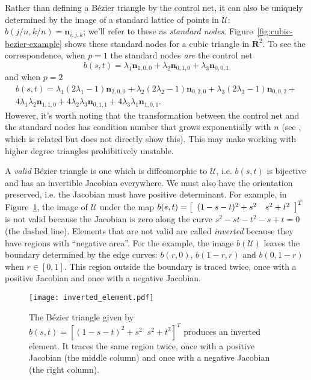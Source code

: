 \documentclass[oneside, reqno]{amsart}
\theoremstyle{definition}
\newcommand{\reals}{\mathbf{R}}
\newcommand{\utri}{\mathcal{U}}
\begin{document}
\noindent Rather than defining a B\'{e}zier triangle by the control net, it can
also be uniquely determined by the image of a standard lattice of
points in \(\utri\): \(b\left(j/n, k/n\right) = \bm{n}_{i, j, k}\);
we'll refer to these as \emph{standard nodes}.
Figure~\ref{fig:cubic-bezier-example} shows these standard nodes for
a cubic triangle in \(\reals^2\). To see the correspondence,
when \(p = 1\) the standard nodes \emph{are} the control net
\begin{equation}
b(s, t) = \lambda_1 \bm{n}_{1, 0, 0} +
\lambda_2 \bm{n}_{0, 1, 0} + \lambda_3 \bm{n}_{0, 0, 1}
\end{equation}
and when \(p = 2\)
\begin{multline}
b(s, t) = \lambda_1\left(2 \lambda_1 - 1\right) \bm{n}_{2, 0, 0} +
\lambda_2\left(2 \lambda_2 - 1\right) \bm{n}_{0, 2, 0} +
\lambda_3\left(2 \lambda_3 - 1\right) \bm{n}_{0, 0, 2} + \\
4 \lambda_1 \lambda_2 \bm{n}_{1, 1, 0} +
4 \lambda_2 \lambda_3 \bm{n}_{0, 1, 1} +
4 \lambda_3 \lambda_1 \bm{n}_{1, 0, 1}.
\end{multline}
However, it's worth noting that the transformation between
the control net and the standard nodes has condition
number that grows exponentially with \(n\) (see \cite{Farouki1991}, which
is related but does not directly show this).
This may make working with
higher degree triangles prohibitively unstable.

A \emph{valid} B\'{e}zier triangle is one which is
diffeomorphic to \(\utri\), i.e. \(b(s, t)\) is bijective and has
an invertible Jacobian everywhere. We must also have the orientation
preserved, i.e. the Jacobian must have positive determinant. For example, in
Figure~\ref{fig:inverted-element}, the image of \(\utri\) under
the map \(b(s, t) = \left[\begin{array}{c c} (1 - s - t)^2 + s^2 & s^2 + t^2
\end{array}\right]^T\) is not valid because the Jacobian is zero along
the curve \(s^2 - st - t^2 - s + t = 0\) (the dashed line). Elements that
are not valid are called \emph{inverted} because they have regions with
``negative area''. For the example, the image \(b\left(\utri\right)\)
leaves the boundary determined by the edge curves: \(b(r, 0)\),
\(b(1 - r, r)\) and \(b(0, 1 - r)\) when \(r \in \left[0, 1\right]\).
This region outside the boundary is traced twice, once with
a positive Jacobian and once with a negative Jacobian.
\begin{figure}
  \texttt{[image: inverted\_element.pdf]}
  \centering
  \captionsetup{width=.75\linewidth}
  \caption{The B\'{e}zier triangle given by \(b(s, t) = \left[
    (1 - s - t)^2 + s^2 \; \; s^2 + t^2 \right]^T\) produces an
    inverted element. It traces the same region twice, once with
    a positive Jacobian (the middle column) and once with a negative
    Jacobian (the right column).}
  \label{fig:inverted-element}
\end{figure}
\end{document}
